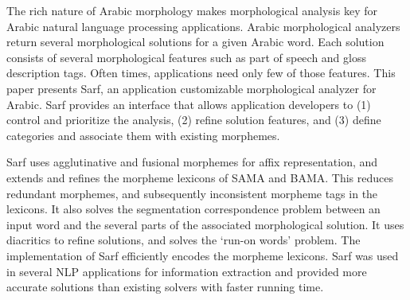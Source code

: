 The rich nature of Arabic morphology makes morphological analysis 
key for Arabic natural language processing applications. 
%
Arabic morphological analyzers return several
morphological solutions for a given Arabic word. 
Each solution consists of several morphological features
such as part of speech and gloss description
tags. 
%
Often times, applications need only few of those features.
%
This paper presents Sarf, an application customizable 
morphological analyzer for Arabic. 
Sarf provides an interface that allows application developers to 
(1) control and prioritize the analysis, 
(2) refine solution features, and
(3) define categories and associate them with existing morphemes. 

Sarf uses agglutinative and fusional morphemes for
affix representation,
and extends and refines the morpheme lexicons of SAMA and BAMA.
This reduces redundant morphemes, and subsequently inconsistent 
morpheme tags in the lexicons.
It also solves the segmentation correspondence problem between 
an input word and the several parts of the associated morphological 
solution. 
It uses diacritics to refine solutions, and 
solves the `run-on words' problem. 
%
The implementation of Sarf efficiently encodes
the morpheme lexicons.
Sarf was used in several NLP 
applications for information extraction and provided more accurate
solutions than existing solvers with faster running time.